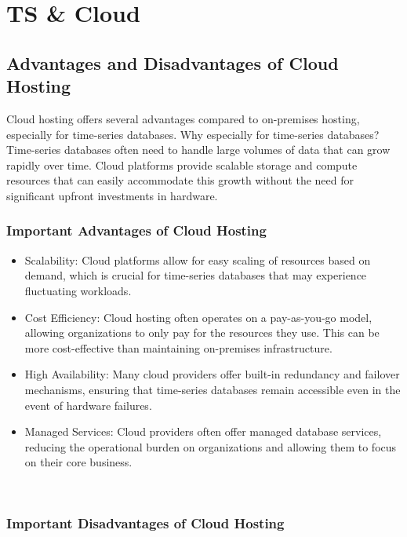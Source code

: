 \chapter{TS \& Cloud}

\section{Advantages and Disadvantages of Cloud Hosting}

Cloud hosting offers several advantages compared to on-premises hosting, especially for time-series databases. Why especially for time-series databases? Time-series databases often need to handle large volumes of data that can grow rapidly over time. Cloud platforms provide scalable storage and compute resources that can easily accommodate this growth without the need for significant upfront investments in hardware.

\subsection{Important Advantages of Cloud Hosting}

\begin{itemize}
  \item Scalability: Cloud platforms allow for easy scaling of resources based on demand, which is crucial for time-series databases that may experience fluctuating workloads.
  \item Cost Efficiency: Cloud hosting often operates on a pay-as-you-go model, allowing organizations to only pay for the resources they use. This can be more cost-effective than maintaining on-premises infrastructure.
  \item High Availability: Many cloud providers offer built-in redundancy and failover mechanisms, ensuring that time-series databases remain accessible even in the event of hardware failures.
  \item Managed Services: Cloud providers often offer managed database services, reducing the operational burden on organizations and allowing them to focus on their core business.
\end{itemize}

~\cite{Cloud:01}
~\cite{Cloud:02}

\subsection{Important Disadvantages of Cloud Hosting}

